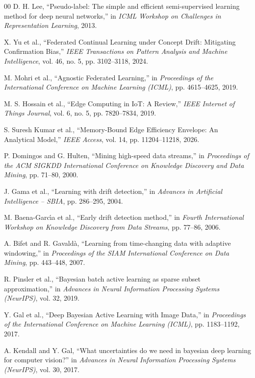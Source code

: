 \documentclass[conference]{IEEEtran}
\begin{document}
\begin{thebibliography}{00}
 D. H. Lee, ``Pseudo-label: The simple and efficient semi-supervised learning method for deep neural networks,'' in \textit{ICML Workshop on Challenges in Representation Learning}, 2013.

 X. Yu et al., ``Federated Continual Learning under Concept Drift: Mitigating Confirmation Bias,'' \textit{IEEE Transactions on Pattern Analysis and Machine Intelligence}, vol. 46, no. 5, pp. 3102--3118, 2024.

 M. Mohri et al., ``Agnostic Federated Learning,'' in \textit{Proceedings of the International Conference on Machine Learning (ICML)}, pp. 4615--4625, 2019.

 M. S. Hossain et al., ``Edge Computing in IoT: A Review,'' \textit{IEEE Internet of Things Journal}, vol. 6, no. 5, pp. 7820--7834, 2019.

 S. Suresh Kumar et al., ``Memory-Bound Edge Efficiency Envelope: An Analytical Model,'' \textit{IEEE Access}, vol. 14, pp. 11204--11218, 2026.

 P. Domingos and G. Hulten, ``Mining high-speed data streams,'' in \textit{Proceedings of the ACM SIGKDD International Conference on Knowledge Discovery and Data Mining}, pp. 71--80, 2000.

 J. Gama et al., ``Learning with drift detection,'' in \textit{Advances in Artificial Intelligence -- SBIA}, pp. 286--295, 2004.

 M. Baena-Garc{\'\i}a et al., ``Early drift detection method,'' in \textit{Fourth International Workshop on Knowledge Discovery from Data Streams}, pp. 77--86, 2006.

 A. Bifet and R. Gavald{\`a}, ``Learning from time-changing data with adaptive windowing,'' in \textit{Proceedings of the SIAM International Conference on Data Mining}, pp. 443--448, 2007.

 R. Pinsler et al., ``Bayesian batch active learning as sparse subset approximation,'' in \textit{Advances in Neural Information Processing Systems (NeurIPS)}, vol. 32, 2019.

 Y. Gal et al., ``Deep Bayesian Active Learning with Image Data,'' in \textit{Proceedings of the International Conference on Machine Learning (ICML)}, pp. 1183--1192, 2017.

 A. Kendall and Y. Gal, ``What uncertainties do we need in bayesian deep learning for computer vision?'' in \textit{Advances in Neural Information Processing Systems (NeurIPS)}, vol. 30, 2017.


\end{thebibliography}
\end{document}
